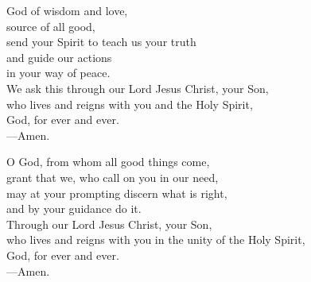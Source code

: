 \prayer


\begin{prayerverse}
God of wisdom and love,\\
source of all good,\\
send your Spirit to teach us your truth\\
and guide our actions\\
in your way of peace.\\
We ask this through our Lord Jesus Christ, your Son,\\
who lives and reigns with you and the Holy Spirit,\\
God, for ever and ever.\\
{\color{red}---\thinspace}Amen.
\end{prayerverse}


\begin{prayerverse}
O God, from whom all good things come,\\
grant that we, who call on you in our need,\\
may at your prompting discern what is right,\\
and by your guidance do it.\\
Through our Lord Jesus Christ, your Son,\\
who lives and reigns with you in the unity of the Holy Spirit,\\
God, for ever and ever.\\
{\color{red}---\thinspace}Amen.
\end{prayerverse}

